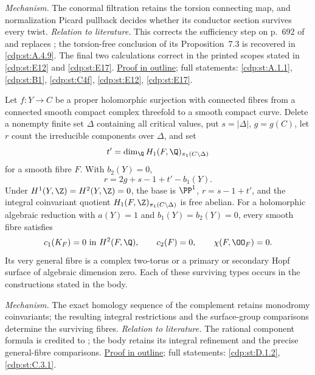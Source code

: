 \textit{Mechanism.} The conormal filtration retains the torsion
connecting map, and normalization Picard pullback decides whether
its conductor section survives every twist.
\textit{Relation to literature.} This corrects the sufficiency step
on p.~692 of \cite{CDP2020} and replaces
\cite[Theorem~2.2]{CDP2020}; the torsion-free conclusion of its
Proposition~7.3 is recovered in \ref{cdp:st:A.4.9}.
The final two calculations correct \cite[Lemma~1.5 and
Proposition~1.1]{CDP98} in the printed scopes stated in
\ref{cdp:st:E12} and \ref{cdp:st:E17}.
\hyperlink{outline-II-A}{Proof in outline}; full statements:
\ref{cdp:st:A.1.1}, \ref{cdp:st:B1}, \ref{cdp:st:C4f},
\ref{cdp:st:E12}, \ref{cdp:st:E17}.

\hypertarget{main-II-B}{}
\begin{maintheorem}
\hypertarget{tag-03K3}{}\label{series:II:B}
Let $f:Y\to C$ be a proper holomorphic surjection with connected
fibres from a connected smooth compact complex threefold to a
smooth compact curve. Delete a nonempty finite set $\Delta$
containing all critical values, put $s=|\Delta|$, $g=g(C)$,
let $r$ count the irreducible components over $\Delta$, and set
\[
 t'=\dim_\Q H_1(F,\Q)_{\pi_1(C\setminus\Delta)}
\]
for a smooth fibre $F$. With $b_2(Y)=0$,
\[
 r=2g+s-1+t'-b_1(Y).
\]
Under $H^1(Y,\Z)=H^2(Y,\Z)=0$, the base is $\PP^1$,
$r=s-1+t'$, and the integral coinvariant quotient
$H_1(F,\Z)_{\pi_1(C\setminus\Delta)}$ is free abelian.
For a holomorphic algebraic reduction with $a(Y)=1$ and
$b_1(Y)=b_2(Y)=0$, every smooth fibre satisfies
\[
 c_1(K_F)=0\text{ in }H^2(F,\Q),\qquad
 c_2(F)=0,\qquad \chi(F,\OO_F)=0.
\]
Its very general fibre is a complex two-torus or a primary or
secondary Hopf surface of algebraic dimension zero. Each of these
surviving types occurs in the constructions stated in the body.

\end{maintheorem}

\textit{Mechanism.} The exact homology sequence of the complement
retains monodromy coinvariants; the resulting integral restrictions
and the surface-group comparisons determine the surviving fibres.
\textit{Relation to literature.} The rational component formula is
credited to \cite[\S10.5, p.~91]{AC2026}; the body retains its
integral refinement and the precise general-fibre comparisons.
\hyperlink{outline-II-B}{Proof in outline}; full statements:
\ref{cdp:st:D.1.2}, \ref{cdp:st:C.3.1}.

